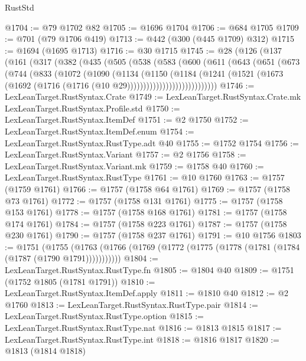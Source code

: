 \begin{lexlean}{RustStd}
\begin{coremodule}
{\begin{coremodule}
{{{{{{{{{{{{{{{{{{{{{{{{{{{{{{{@1704 := @79 @1702 @82
@1705 := @1696 @1704
@1706 := @684 @1705
@1709 := @701 (@79 @1706 @419)
@1713 := @442 (@300 (@445 @1709) @312)
@1715 := @1694 (@1695 @1713)
@1716 := @30 @1715
@1745 := @28
    (@126
      (@137
        (@161
          (@317
            (@382
              (@435
                (@505
                  (@538
                    (@583
                      (@600
                        (@611
                          (@643
                            (@651
                              (@673
                                (@744
                                  (@833
                                    (@1072
                                      (@1090
                                        (@1134
                                          (@1150
                                            (@1184
                                              (@1241
                                                (@1521
                                                  (@1673
                                                    (@1692
                                                      (@1716
                                                        (@1716 (@10 @29))))))))))))))))))))))))))))
@1746 := LexLeanTarget.RustSyntax.Crate
@1749 := LexLeanTarget.RustSyntax.Crate.mk LexLeanTarget.RustSyntax.Profile.std
@1750 := LexLeanTarget.RustSyntax.ItemDef
@1751 := @2 @1750
@1752 := LexLeanTarget.RustSyntax.ItemDef.enum
@1754 := LexLeanTarget.RustSyntax.RustType.adt @40
@1755 := @1752 @1754
@1756 := LexLeanTarget.RustSyntax.Variant
@1757 := @2 @1756
@1758 := LexLeanTarget.RustSyntax.Variant.mk
@1759 := @1758 @40
@1760 := LexLeanTarget.RustSyntax.RustType
@1761 := @10 @1760
@1763 := @1757 (@1759 @1761)
@1766 := @1757 (@1758 @64 @1761)
@1769 := @1757 (@1758 @73 @1761)
@1772 := @1757 (@1758 @131 @1761)
@1775 := @1757 (@1758 @153 @1761)
@1778 := @1757 (@1758 @168 @1761)
@1781 := @1757 (@1758 @174 @1761)
@1784 := @1757 (@1758 @223 @1761)
@1787 := @1757 (@1758 @230 @1761)
@1790 := @1757 (@1758 @237 @1761)
@1791 := @10 @1756
@1803 := @1751
    (@1755 (@1763 (@1766 (@1769 (@1772 (@1775 (@1778 (@1781 (@1784 (@1787 (@1790 @1791)))))))))))
@1804 := LexLeanTarget.RustSyntax.RustType.fn
@1805 := @1804 @40
@1809 := @1751 (@1752 @1805 (@1781 @1791))
@1810 := LexLeanTarget.RustSyntax.ItemDef.apply
@1811 := @1810 @40
@1812 := @2 @1760
@1813 := LexLeanTarget.RustSyntax.RustType.pair
@1814 := LexLeanTarget.RustSyntax.RustType.option
@1815 := LexLeanTarget.RustSyntax.RustType.nat
@1816 := @1813 @1815
@1817 := LexLeanTarget.RustSyntax.RustType.int
@1818 := @1816 @1817
@1820 := @1813 (@1814 @1818)
}}}}}}}}}}}}}}}}}}}}}}}}}}}}}}}
\end{coremodule}}
\end{coremodule}
\end{lexlean}
